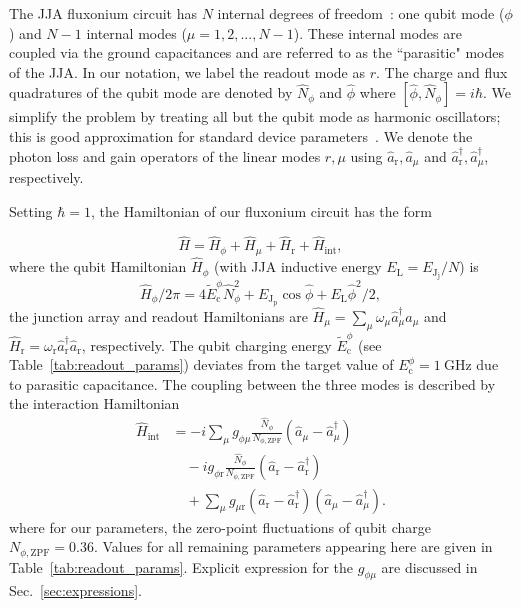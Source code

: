\documentclass[%
reprint,
superscriptaddress,
 amsmath,amssymb,
 aps,
 prx,
longbibliography,
floatfix,
]{revtex4-2}
\begin{document}
The JJA fluxonium circuit has $N$ internal degrees of freedom~\cite{ferguson2013symmetries,viola2015collective}: one qubit mode ($\phi$) and $N-1$ internal modes ($\mu=1,2,...,N-1$). These  internal modes are coupled via the ground capacitances and are referred to as the ``parasitic" modes of the JJA. 
In our notation, we label the readout mode as $r$. The charge and flux quadratures of the qubit mode are denoted by $\hat N_\phi$ and $\hat \phi$ where $[\hat \phi,\hat N_\phi]=i\hbar$. 
We simplify the problem by treating all but the qubit mode as harmonic oscillators; this is good approximation for standard device parameters~\cite{ferguson2013symmetries,viola2015collective,dumas2024unified}. We denote the photon loss and gain operators of the linear modes $r,\mu$ using $\hat a_\textrm{r},\hat a_\mu$ and $\hat a_\textrm{r}^\dagger,\hat a_\mu^\dagger$, respectively. 

Setting $\hbar=1$, the Hamiltonian of our fluxonium circuit has the form~\cite{viola2015collective}

\begin{equation}
   \hat H =\hat{H}_\phi + \hat{H}_\mu + \hat{H}_\textrm{r} + \hat{H}_{\textrm{int}},\label{Hamiltonian_total}
\end{equation}
where the qubit Hamiltonian $\hat{H}_\phi$ (with JJA inductive energy $E_\textrm{L}=E_{\textrm{J}_\textrm{j}}/N$) is 
\begin{equation}
\hat{H}_\phi / 2\pi = 4\tilde{E}^\phi_\textrm{c} \hat N_\phi^2+ E_{\textrm{J}_\textrm{p}}\cos{\hat\phi}+E_\textrm{L}\hat \phi^2 /2,\label{eq:Hphi}
\end{equation}
the junction array and readout Hamiltonians are $\hat{H}_\mu = \sum_{\mu}\omega_\mu \hat a_\mu^\dagger \hat a_\mu$ and $\hat{H}_\textrm{r} = \omega_\textrm{r} \hat a_\textrm{r}^\dagger \hat a_\textrm{r}$, respectively. The qubit charging energy
$\tilde{E}^\phi_\textrm{c}$ (see Table~\ref{tab:readout_params}) deviates from the target value of $E_{\textrm{c}}^{\phi}=1 \ \mathrm{GHz}$ due to parasitic capacitance. The coupling between the three modes is described by the interaction Hamiltonian
\begin{align}\label{eq:int_hamiltonian}
\hat{H}_{\textrm{int}} &= -i\sum_{\mu} g_{\phi\mu} \frac{\hat N_\phi}{{N_{\phi,\mathrm{ZPF}}}} (\hat a_\mu-\hat a_\mu^\dagger)\nonumber \\ &\quad-ig_{\phi \textrm{r}} \frac{\hat N_\phi}{{N_{\phi,\mathrm{ZPF}}}} (\hat a_\textrm{r}-\hat a_\textrm{r}^\dagger) \nonumber \\&\quad+ \sum_{\mu} g_{\mu \textrm{r}} (\hat a_\textrm{r}-\hat a_\textrm{r}^\dagger)(\hat a_\mu-\hat a_\mu^\dagger).
\end{align}
where for our parameters, the zero-point fluctuations of qubit charge  $N_{\phi,\mathrm{ZPF}}=0.36$. Values for all remaining parameters appearing here are given in Table~\ref{tab:readout_params}. Explicit expression for the $g_{\phi\mu}$ are discussed in Sec.~\ref{sec:expressions}.%
\end{document}
